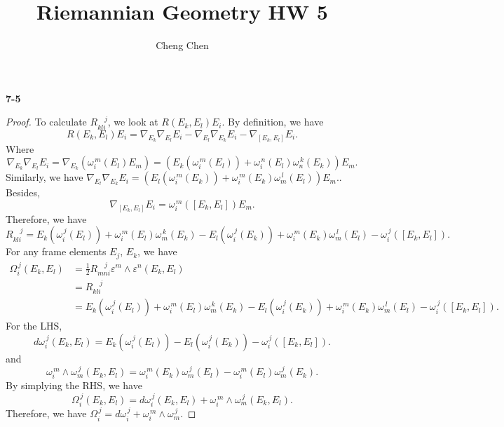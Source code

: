 \documentclass[11pt, a4paper]{article}
\title{Riemannian Geometry HW 5}
\author{Cheng Chen}
\date{}
\theoremstyle{plain}
\theoremstyle{definition}
\theoremstyle{remark}
\begin{document}
\maketitle


\newcommand{\rr}[2]{R_{#1}^{\quad #2}}
\newcommand{\n}{\nabla}
\newcommand{\w}[2]{\omega_{#1}^{\, #2}}
\newcommand{\W}[2]{\Omega_{#1}^{\, #2}}
\newcommand{\eps}{\varepsilon}
\noindent\textbf{7-5}
\begin{proof}
    To calculate $\rr{kli}{j}$, we look at $R(E_k,E_l)E_i$. By definition, we have
    \[R(E_k,E_l)E_i = \n_{E_k}\n_{E_l}E_i - \n_{E_l}\n_{E_k}E_i - \n_{[E_k,E_l]}E_i.\]
    Where
    \[\n_{E_k}\n_{E_l}E_i = \n_{E_k}(\w{i}{m}(E_l)E_m) = (E_k(\w{i}{m}(E_l)) + \w{i}{n}(E_l)\w{n}{k}(E_k))E_m.\]
    \newcommand{\aaa}[4]{E_#1(\w{#3}{#4}(E_#2)) + \w{#3}{m}(E_#2)\w{m}{#1}(E_#1)}
    Similarly, we have $\n_{E_l}\n_{E_k}E_i = (E_l(\w{i}{m}(E_k)) + \w{i}{m}(E_k)\w{m}{l}(E_l))E_m.$. Besides,
    \[\n_{[E_k,E_l]}E_i = \w{i}{m}([E_k,E_l])E_m.\]
    Therefore, we have 
    \[\rr{kli}{j} = \aaa{k}{l}{i}{j} - \aaa{l}{k}{i}{j} - \w{i}{j}([E_k,E_l]).\]
    For any frame elements $E_j,\,E_k$, we have
    \begin{align*}
        \W{i}{j}(E_k,E_l) &= \frac{1}{2}\rr{mni}{j} \eps^m\wedge\eps^n (E_k,E_l)\\
        &= \rr{kli}{j}\\ &= \aaa{k}{l}{i}{j} - \aaa{l}{k}{i}{j} - \w{i}{j}([E_k,E_l]).
    \end{align*}
    For the LHS,
    \[d\w{i}{j}(E_k,E_l) = E_k(\w{i}{j}(E_l)) - E_l(\w{i}{j}(E_k)) - \w{i}{j}([E_k,E_l]).\]
    and
    \[\w{i}{m}\wedge\w{m}{j}(E_k,E_l) = \w{i}{m}(E_k)\w{m}{j}(E_l) - \w{i}{m}(E_l)\w{m}{j}(E_k).\]
    By simplying the RHS, we have
    \[\W{i}{j}(E_k,E_l) = d\w{i}{j}(E_k,E_l) + \w{i}{m}\wedge\w{m}{j}(E_k,E_l).\]   
    Therefore, we have $\W{i}{j} = d\w{i}{j} + \w{i}{m}\wedge\w{m}{j}$.
\end{proof}
\end{document}
